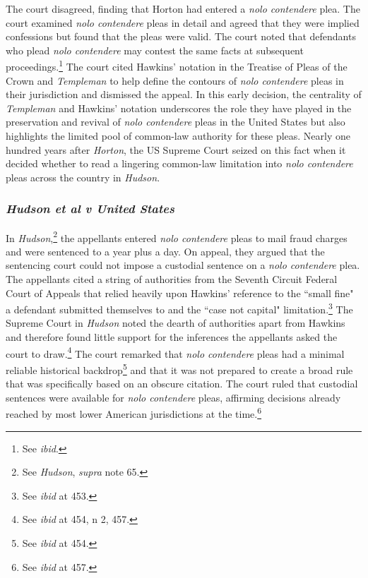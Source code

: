 The court disagreed, finding that Horton had entered a \textit{nolo contendere} plea. The court examined \textit{nolo contendere} pleas in detail and agreed that they were implied confessions but found that the pleas were valid. The court noted that defendants who plead \textit{nolo contendere} may contest the same facts at subsequent proceedings.\footnote{See \textit{ibid}.} The court cited Hawkins' notation in the Treatise of Pleas of the Crown and \textit{Templeman} to help define the contours of \textit{nolo contendere} pleas in their jurisdiction and dismissed the appeal. In this early decision, the centrality of \textit{Templeman} and Hawkins' notation underscores the role they have played in the preservation and revival of \textit{nolo contendere} pleas in the United States but also highlights the limited pool of common-law authority for these pleas. Nearly one hundred years after \textit{Horton}, the US Supreme Court seized on this fact when it decided whether to read a lingering common-law limitation into \textit{nolo contendere} pleas across the country in \textit{Hudson}.

\subsubsection{\textit{Hudson et al v United States}}

In \textit{Hudson},\footnote{See \textit{Hudson}, \textit{supra} note 65.} the appellants entered \textit{nolo contendere} pleas to mail fraud charges and were sentenced to a year plus a day. On appeal, they argued that the sentencing court could not impose a custodial sentence on a \textit{nolo contendere} plea. The appellants cited a string of authorities from the Seventh Circuit Federal Court of Appeals that relied heavily upon Hawkins' reference to the ``small fine" a defendant submitted themselves to and the ``case not capital" limitation.\footnote{See \textit{ibid} at 453.} The Supreme Court in \textit{Hudson} noted the dearth of authorities apart from Hawkins and therefore found little support for the inferences the appellants asked the court to draw.\footnote{See \textit{ibid} at 454, n 2, 457.} The court remarked that \textit{nolo contendere} pleas had a minimal reliable historical backdrop\footnote{See \textit{ibid} at 454.} and that it was not prepared to create a broad rule that was specifically based on an obscure citation. The court ruled that custodial sentences were available for \textit{nolo contendere} pleas, affirming decisions already reached by most lower American jurisdictions at the time.\footnote{See \textit{ibid} at 457.}


